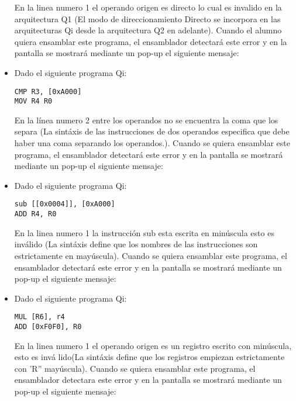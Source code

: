 \begin{itemize}
En la linea numero 1 el operando origen es directo lo cual es invalido en la arquitectura Q1 (El modo de direccionamiento Directo se incorpora en las arquitecturas Qi desde la arquitectura Q2 en adelante). Cuando el alumno quiera ensamblar este programa, el ensamblador detectará este error y en la pantalla se mostrará mediante un pop-up el siguiente mensaje:


\item Dado el siguiente programa Qi:

\begin{verbatim}
CMP R3, [0xA000]
MOV R4 R0 
\end{verbatim}

En la línea numero 2 entre los operandos no se encuentra la coma que los separa (La sintáxis de las instrucciones de dos operandos especifica que debe haber una coma separando los operandos.). Cuando se quiera ensamblar este programa, el ensamblador detectará este error y en la pantalla se mostrará mediante un pop-up el siguiente mensaje:


\item Dado el siguiente programa Qi:

\begin{verbatim}
sub [[0x0004]], [0xA000]
ADD R4, R0
\end{verbatim}

En la linea numero 1 la instrucción sub esta escrita en minúscula esto es inválido (La sintáxis define que los nombres de las instrucciones son estrictamente en mayúscula). Cuando se quiera ensamblar este programa, el ensamblador detectará este error y en la pantalla se mostrará mediante un pop-up el siguiente mensaje:


\item Dado el siguiente programa Qi:

\begin{verbatim}
MUL [R6], r4
ADD [0xF0F0], R0
\end{verbatim}

En la linea numero 1 el operando origen es un registro escrito con minúscula, esto es invá lido(La sintáxis define que los registros empiezan estrictamente con 'R'' mayúscula). Cuando se quiera ensamblar este programa, el ensamblador detectara este error y en la pantalla se mostrará mediante un pop-up el siguiente mensaje:


\end{itemize}
